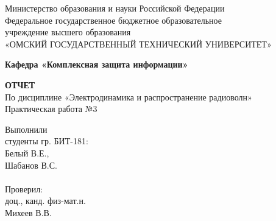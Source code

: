\documentclass[14pt,a4paper]{scrartcl}
\begin{document}
  \begin{titlepage}                                                         
    \newpage                                                                        
    \begin{center}   
      Министерство образования и науки Российской Федерации  \\ 
      \vspace{1em}                                                    
      {\mdseries
        Федеральное государственное бюджетное образовательное \\
        учреждение высшего образования \\
        «ОМСКИЙ ГОСУДАРСТВЕННЫЙ ТЕХНИЧЕСКИЙ УНИВЕРСИТЕТ»
      }                               
      \vspace{1em}      

      {\bfseries Кафедра «Комплексная защита информации»}  

      \vspace{\fill}                                                         
                                   
      {\bfseries ОТЧЕТ } \\                                 
      По дисциплине «Электродинамика и распространение радиоволн» \\ 
      \vspace{1em} 
      Практическая работа №3 \\                                                           
    \end{center}                                                          
                                                                                        
    \vspace{\fill}                                                         
                                                                                        
    \hfill\parbox{5cm}{
      Выполнили\\
      студенты гр. БИТ-181:\\
      Белый В.Е., \\
      Шабанов В.С.\\
      \\
      Проверил:\\
      доц., канд. физ-мат.н. \\
      Михеев В.В.\\
    }                                                                                                                              
                                                                                                                                                                              

\end{titlepage}
\end{document}
